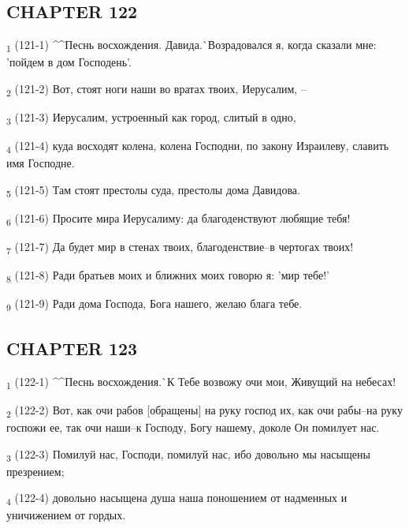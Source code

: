 \subsection{CHAPTER 122}
\begin{tcolorbox}
\textsubscript{1} (121-1) ^^Песнь восхождения. Давида.^^ Возрадовался я, когда сказали мне: 'пойдем в дом Господень'.
\end{tcolorbox}
\begin{tcolorbox}
\textsubscript{2} (121-2) Вот, стоят ноги наши во вратах твоих, Иерусалим, --
\end{tcolorbox}
\begin{tcolorbox}
\textsubscript{3} (121-3) Иерусалим, устроенный как город, слитый в одно,
\end{tcolorbox}
\begin{tcolorbox}
\textsubscript{4} (121-4) куда восходят колена, колена Господни, по закону Израилеву, славить имя Господне.
\end{tcolorbox}
\begin{tcolorbox}
\textsubscript{5} (121-5) Там стоят престолы суда, престолы дома Давидова.
\end{tcolorbox}
\begin{tcolorbox}
\textsubscript{6} (121-6) Просите мира Иерусалиму: да благоденствуют любящие тебя!
\end{tcolorbox}
\begin{tcolorbox}
\textsubscript{7} (121-7) Да будет мир в стенах твоих, благоденствие--в чертогах твоих!
\end{tcolorbox}
\begin{tcolorbox}
\textsubscript{8} (121-8) Ради братьев моих и ближних моих говорю я: 'мир тебе!'
\end{tcolorbox}
\begin{tcolorbox}
\textsubscript{9} (121-9) Ради дома Господа, Бога нашего, желаю блага тебе.
\end{tcolorbox}
\subsection{CHAPTER 123}
\begin{tcolorbox}
\textsubscript{1} (122-1) ^^Песнь восхождения.^^ К Тебе возвожу очи мои, Живущий на небесах!
\end{tcolorbox}
\begin{tcolorbox}
\textsubscript{2} (122-2) Вот, как очи рабов [обращены] на руку господ их, как очи рабы--на руку госпожи ее, так очи наши--к Господу, Богу нашему, доколе Он помилует нас.
\end{tcolorbox}
\begin{tcolorbox}
\textsubscript{3} (122-3) Помилуй нас, Господи, помилуй нас, ибо довольно мы насыщены презрением;
\end{tcolorbox}
\begin{tcolorbox}
\textsubscript{4} (122-4) довольно насыщена душа наша поношением от надменных и уничижением от гордых.
\end{tcolorbox}
